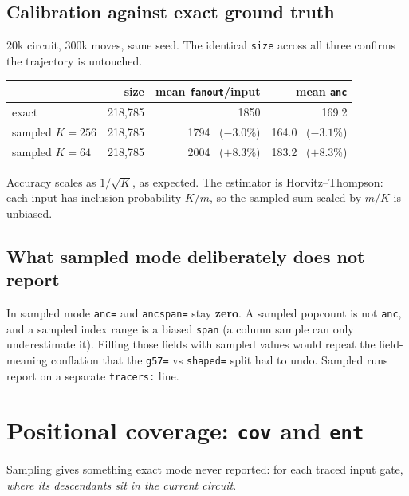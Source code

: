 \documentclass[11pt]{article}
\begin{document}
\subsection{Calibration against exact ground truth}

20k circuit, 300k moves, same seed. The identical \texttt{size} across all three
confirms the trajectory is untouched.

\begin{center}
\begin{tabular}{lrrr}
\toprule
 & size & mean \texttt{fanout}/input & mean \texttt{anc} \\
\midrule
exact                & 218{,}785 & 1850 & 169.2 \\
sampled $K=256$      & 218{,}785 & 1794 \ ($-3.0\%$) & 164.0 \ ($-3.1\%$) \\
sampled $K=64$       & 218{,}785 & 2004 \ ($+8.3\%$) & 183.2 \ ($+8.3\%$) \\
\bottomrule
\end{tabular}
\end{center}

Accuracy scales as $1/\sqrt{K}$, as expected. The estimator is
Horvitz--Thompson: each input has inclusion probability $K/m$, so the sampled sum
scaled by $m/K$ is unbiased.

\subsection{What sampled mode deliberately does not report}

In sampled mode \texttt{anc=} and \texttt{ancspan=} stay \textbf{zero}. A sampled
popcount is not \texttt{anc}, and a sampled index range is a biased \texttt{span}
(a column sample can only underestimate it). Filling those fields with sampled
values would repeat the field-meaning conflation that the \texttt{g57=}
vs \texttt{shaped=} split had to undo. Sampled runs report on a separate
\texttt{tracers:} line.

\section{Positional coverage: \texttt{cov} and \texttt{ent}}

Sampling gives something exact mode never reported: for each traced input gate,
\emph{where its descendants sit in the current circuit}.
\end{document}
